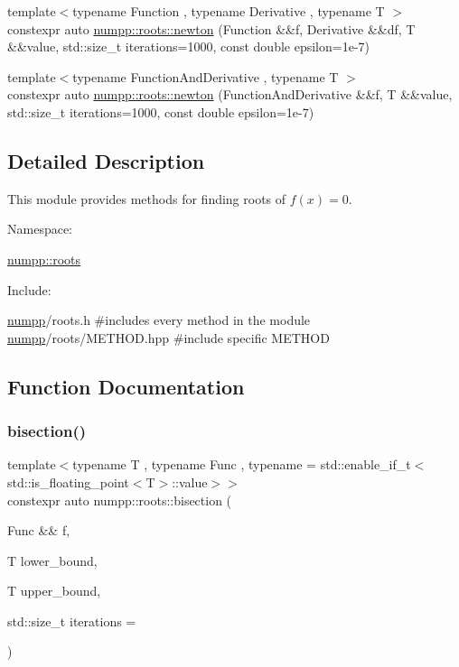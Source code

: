 \begin{DoxyCompactItemize}
\item 
{\footnotesize template$<$typename Function , typename Derivative , typename T $>$ }\\constexpr auto \hyperlink{group__numpp__roots_ga0c3358cbe925f1840d2332f81dec42ab}{numpp\+::roots\+::newton} (Function \&\&f, Derivative \&\&df, T \&\&value, std\+::size\+\_\+t iterations=1000, const double epsilon=1e-\/7)
\item 
{\footnotesize template$<$typename Function\+And\+Derivative , typename T $>$ }\\constexpr auto \hyperlink{group__numpp__roots_ga7784b72874be701ab11320a8ab594e6f}{numpp\+::roots\+::newton} (Function\+And\+Derivative \&\&f, T \&\&value, std\+::size\+\_\+t iterations=1000, const double epsilon=1e-\/7)
\end{DoxyCompactItemize}


\subsection{Detailed Description}
This module provides methods for finding roots of $f(x) = 0$. 

Namespace\+: 
\begin{DoxyCode}
\hyperlink{namespacenumpp_1_1roots}{numpp::roots}
\end{DoxyCode}


Include\+: 
\begin{DoxyCode}
\hyperlink{namespacenumpp}{numpp}/roots.h #includes every method in the module
\hyperlink{namespacenumpp}{numpp}/roots/METHOD.hpp #include specific METHOD
\end{DoxyCode}
 

\subsection{Function Documentation}
\mbox{\label{group__numpp__roots_ga8b5bb65b3192456c184a331f88af0b56}} 
\subsubsection{\texorpdfstring{bisection()}{bisection()}\hspace{0.1cm}{\footnotesize\ttfamily [1/2]}}
{\footnotesize\ttfamily template$<$typename T , typename Func , typename  = std\+::enable\+\_\+if\+\_\+t$<$std\+::is\+\_\+floating\+\_\+point$<$\+T$>$\+::value$>$$>$ \\
constexpr auto numpp\+::roots\+::bisection (\begin{DoxyParamCaption}\item[{Func \&\&}]{f,  }\item[{T}]{lower\+\_\+bound,  }\item[{T}]{upper\+\_\+bound,  }\item[{std\+::size\+\_\+t}]{iterations = {} }\end{DoxyParamCaption})}

